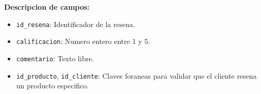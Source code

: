\textbf{Descripcion de campos:}

\begin{itemize}
  \item \texttt{id\_resena}: Identificador de la resena.
  \item \texttt{calificacion}: Numero entero entre 1 y 5.
  \item \texttt{comentario}: Texto libre.
  \item \texttt{id\_producto}, \texttt{id\_cliente}: Claves foraneas para validar que el cliente resena un producto especifico.
\end{itemize}

